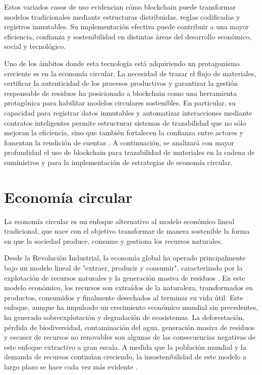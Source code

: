 Estos variados casos de uso evidencian cómo blockchain puede transformar modelos tradicionales mediante estructuras distribuidas, reglas codificadas y registros inmutables. Su implementación efectiva puede contribuir a una mayor eficiencia, confianza y sostenibilidad en distintas áreas del desarrollo económico, social y tecnológico.

Uno de los ámbitos donde esta tecnología está adquiriendo un protagonismo creciente es en la economía circular. La necesidad de trazar el flujo de materiales, certificar la autenticidad de los procesos productivos y garantizar la gestión responsable de residuos ha posicionado a blockchain como una herramienta protagónica para habilitar modelos circulares sostenibles. En particular, su capacidad para registrar datos inmutables y automatizar interacciones mediante contratos inteligentes permite estructurar sistemas de trazabilidad que no sólo mejoran la eficiencia, sino que también fortalecen la confianza entre actores y fomentan la rendición de cuentas \cite{sharabati2024blockchain, rejeb2023role}. A continuación, se analizará con mayor profundidad el uso de blockchain para trazabilidad de materiales en la cadena de suministros y para la implementación de estrategias de economía circular.

\section{Economía circular}

La economía circular es un enfoque alternativo al modelo económico lineal tradicional, que nace con el objetivo transformar de manera sostenible la forma en que la sociedad produce, consume y gestiona los recursos naturales.

Desde la Revolución Industrial, la economía global ha operado principalmente bajo un modelo lineal de "extraer, producir y consumir", caracterizado por la explotación de recursos naturales y la generación masiva de residuos \cite{cerda2016economia}. En este modelo económico, los recursos son extraídos de la naturaleza, transformados en productos, consumidos y finalmente desechados al terminar su vida útil. Este enfoque, aunque ha impulsado un crecimiento económico mundial sin precedentes, ha generado sobreexplotación y degradación de ecosistemas. La deforestación, pérdida de biodiversidad, contaminación del agua, generación masiva de residuos y escasez de recursos no renovables son algunas de las consecuencias negativas de este enfoque extractivo a gran escala. A medida que la población mundial y la demanda de recursos continúan creciendo, la insostenibilidad de este modelo a largo plazo se hace cada vez más evidente \cite{clima2022book}.

